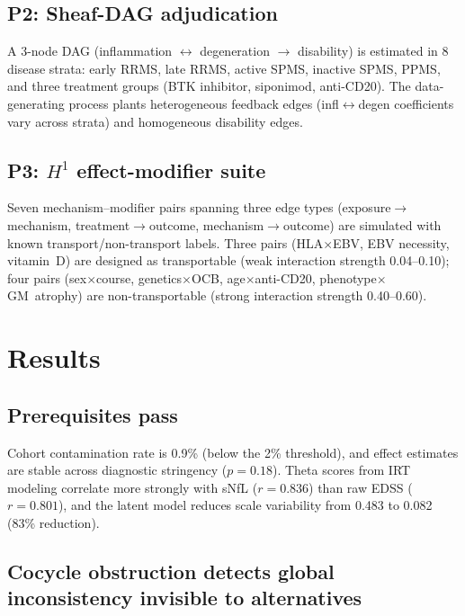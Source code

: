 \documentclass[11pt]{article}
\begin{document}
\subsection{P2: Sheaf-DAG adjudication}

A 3-node DAG (inflammation $\leftrightarrow$ degeneration $\to$
disability) is estimated in 8 disease strata: early RRMS, late RRMS,
active SPMS, inactive SPMS, PPMS, and three treatment groups (BTK
inhibitor, siponimod, anti-CD20). The data-generating process plants
heterogeneous feedback edges (infl$\leftrightarrow$degen coefficients
vary across strata) and homogeneous disability edges.

\subsection{P3: $H^1$ effect-modifier suite}

Seven mechanism--modifier pairs spanning three edge types
(exposure$\to$mechanism, treatment$\to$outcome, mechanism$\to$outcome)
are simulated with known transport/non-transport labels. Three pairs
(HLA$\times$EBV, EBV necessity, vitamin~D) are designed as transportable
(weak interaction strength 0.04--0.10); four pairs (sex$\times$course,
genetics$\times$OCB, age$\times$anti-CD20,
phenotype$\times$GM~atrophy) are non-transportable (strong interaction
strength 0.40--0.60).

\section{Results}

\subsection{Prerequisites pass}

Cohort contamination rate is 0.9\% (below the 2\% threshold), and effect
estimates are stable across diagnostic stringency ($p = 0.18$). Theta
scores from IRT modeling correlate more strongly with sNfL ($r = 0.836$)
than raw EDSS ($r = 0.801$), and the latent model reduces scale
variability from 0.483 to 0.082 (83\% reduction).

\subsection{Cocycle obstruction detects global inconsistency invisible to alternatives}
\end{document}
